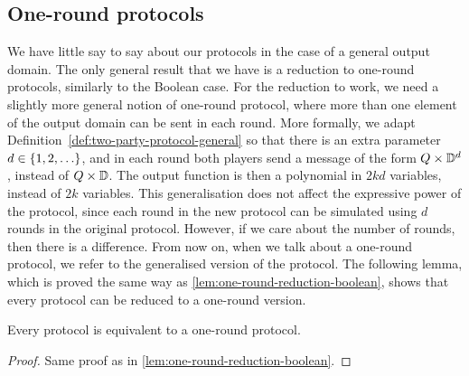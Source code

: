 \subsection{One-round protocols}

We have little say to say about our protocols in the case of a general output domain. The only general result that we have is a reduction to one-round protocols, similarly to the Boolean case.  For the reduction to work, we need a slightly more general notion of one-round protocol, where more than one element of the output domain can be sent in each round. More formally, we adapt Definition~\ref{def:two-party-protocol-general} so that there is an extra parameter $d \in \{1,2,\ldots\}$, and in each round both players send a message of the form $Q \times \mathbb D^d$, instead of $Q \times \mathbb D$. The output function is then a polynomial in $2kd$ variables, instead of $2k$ variables. This generalisation does not affect the expressive power of the protocol, since each round in the new protocol can be simulated using $d$ rounds in the original protocol. However, if we care about the number of rounds, then there is a difference.  From now on, when we talk about a one-round protocol, we refer to the generalised version of the protocol. The following lemma, which is proved the same way as \cref{lem:one-round-reduction-boolean}, shows that  every protocol can be reduced to a one-round version.
     \begin{lemma}\label{lemma:one-round-reduction-general}
        Every protocol is equivalent to a one-round protocol.
 \end{lemma}
 \begin{proof}
    Same proof as in \cref{lem:one-round-reduction-boolean}. 
 \end{proof}